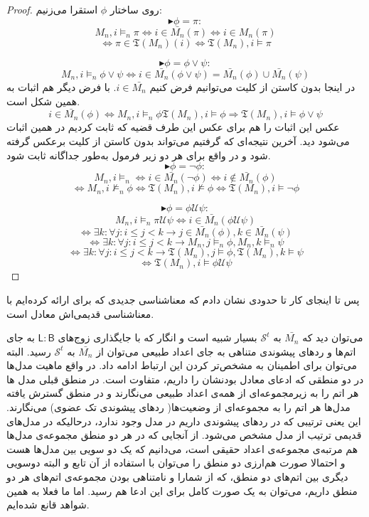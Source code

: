 \begin{proof}
	روی ساختار $\phi$ استقرا می‌زنیم:
	$$\blacktriangleright \phi=\pi:$$
	$$M_n , i \models_n \pi \iff i \in \bar{M_n} (\pi) \iff i \in M_n(\pi)$$
	$$\iff \pi \in \mathfrak{T}(M_n)(i) \iff \mathfrak{T}(M_n),i \models \pi $$
	
	$$\blacktriangleright \phi=\phi \lor \psi:$$
	$$M_n , i \models_n \phi \lor \psi  \iff i\in \bar{M_n}(\phi \lor \psi) = \bar{M_n} (\phi) \cup \bar{M_n}(\psi)$$
	در اینجا بدون کاستن از کلیت می‌توانیم فرض کنیم $i \in \bar{M_n}$. با فرض دیگر هم اثبات به همین شکل است.
	$$i \in \bar{M_n}(\phi) \iff M_n,i\models_n \phi \mathfrak{T}(M_n),i \models \phi \Rightarrow \mathfrak{T}(M_n),i\models \phi \lor \psi$$
	عکس این اثبات را هم برای عکس این طرف قضیه که ثابت کردیم در همین اثبات می‌شود دید. آخرین نتیجه‌ای که گرفتیم می‌تواند بدون کاستن از کلیت برعکس گرفته شود و در واقع برای هر دو زیر فرمول به‌طور جداگانه ثابت شود.
	$$\blacktriangleright \phi=\neg \phi:$$
	$$M_n,i \models_n \iff i \in \bar{M_n}(\neg \phi) \iff i \notin \bar{M_n}(\phi)$$
	$$\iff M_n ,i \nvDash_n \phi \iff \mathfrak{T}(M_n),i \nvDash \phi \iff \mathfrak{T} (M_n) ,i \models \neg \phi$$ 
	
	$$\blacktriangleright \phi=\phi \mathcal{U} \psi:$$
	$$M_n,i \models_n \pi \mathcal{U} \psi \iff i \in \bar{M_n}(\phi \mathcal{U}\psi)$$
	$$\iff \exists k: \forall j: i \leq j < k \rightarrow j \in \bar{M_n}(\phi) , k \in \bar{M_n}(\psi)$$
	$$\iff \exists k: \forall j: i \leq j < k \rightarrow M_n,j \models_n\phi ,  M_n,k\models_n \psi$$
	$$\iff \exists k: \forall j: i \leq j < k \rightarrow \mathfrak{T}(M_n),j \models\phi ,  \mathfrak{T}(M_n),k\models \psi$$
	$$\iff \mathfrak{T}(M_n),i \models \phi \mathcal{U} \psi$$
	
\end{proof}

پس تا اینجای کار تا حدودی نشان دادم که معناشناسی جدیدی که برای  ارائه کرده‌ایم با معناشناسی قدیمی‌اش معادل است. 

می‌توان دید که $\bar{M_n}$ به
$\mathcal{S}^t$
بسیار شبیه است و انگار که با جایگذاری زوج‌های 
$\mathsf{L:B}$ به جای اتم‌ها و ردهای پیشوندی متناهی به جای اعداد طبیعی می‌توان 
از 
$\bar{M_n}$
به 
$\mathcal{S}^t$
رسید. البته می‌توان برای اطمینان به مشخص‌تر کردن این ارتباط ادامه داد. در واقع ماهیت مدل‌ها در دو منطقی که ادعای معادل بودنشان را داریم، متفاوت است. در منطق قبلی مدل ها هر اتم را به زیرمجموعه‌ای از همه‌ی اعداد طبیعی می‌نگارند و در منطق گسترش یافته مدل‌ها هر اتم را به مجموعه‌ای از وضعیت‌ها( ردهای پیشوندی تک عضوی) می‌نگارند. این یعنی ترتیبی که در ردهای پیشوندی داریم در مدل وجود ندارد، درحالیکه در مدل‌های قدیمی ترتیب از مدل مشخص می‌شود. از آنجایی که در هر دو منطق مجموعه‌ی مدل‌ها هم مرتبه‌ی مجموعه‌ی اعداد حقیقی است، می‌دانیم که یک دو سویی بین مدل‌ها هست و احتمالا صورت هم‌ارزی دو منطق را می‌توان با استفاده از آن تابع و البته دوسویی دیگری بین اتم‌های دو منطق، که از شمارا و نامتناهی بودن مجموعه‌ی اتم‌های هر دو منطق داریم، می‌توان به یک صورت کامل برای این ادعا هم رسید. اما ما فعلا به همین شواهد قانع شده‌ایم.

